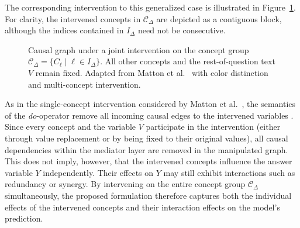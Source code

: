 The corresponding intervention to this generalized case is illustrated in Figure~\ref{fig:dgp_joint_intervened}. For clarity, the intervened concepts in $\mathcal{C}_{\Delta}$ are depicted as a contiguous block, although the indices contained in $I_{\Delta}$ need not be consecutive.

\begin{figure}[ht]
	\centering
	
	\caption[Causal graph under a joint intervention on a concept group]{Causal graph under a joint intervention on the concept group $\mathcal{C}_{\Delta}=\{C_\ell \mid \ell \in I_{\Delta}\}$. All other concepts and the rest-of-question text $V$ remain fixed. Adapted from Matton et al.~\cite{mattonWalkTalkMeasuring2024} with color distinction and multi-concept intervention.}
	\label{fig:dgp_joint_intervened}
\end{figure}

As in the single-concept intervention considered by Matton et al.~\cite{mattonWalkTalkMeasuring2024}, the semantics of the \emph{do}-operator remove all incoming causal edges to the intervened variables \cite{pearlCausality2009}. Since every concept and the variable $V$ participate in the intervention (either through value replacement or by being fixed to their original values), all causal dependencies within the mediator layer are removed in the manipulated graph. This does not imply, however, that the intervened concepts influence the answer variable $Y$ independently. Their effects on $Y$ may still exhibit interactions such as redundancy or synergy. By intervening on the entire concept group $\mathcal{C}_{\Delta}$ simultaneously, the proposed formulation therefore captures both the individual effects of the intervened concepts and their interaction effects on the model's prediction.

